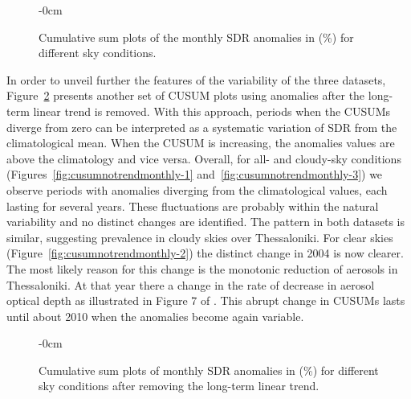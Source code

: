 \documentclass[applsci,article,submit,moreauthors,pdftex]{Definitions/mdpi}
\begin{document}
\begin{figure}[h!]
    \begin{adjustwidth}{-\extralength}{0cm}
        {\centering 
        \hfill
        \hfill
        \hfill
        }
\caption{Cumulative sum plots of the monthly SDR anomalies in (\%) for different sky conditions.}\label{fig:cusummonth}
\end{adjustwidth}
\end{figure}

In order to unveil further the features of the variability of the three
datasets, Figure~\ref{fig:cusumnotrendmonthly} presents another set of
CUSUM plots using anomalies after the long-term linear trend is removed.
With this approach, periods when the CUSUMs diverge from zero can be
interpreted as a systematic variation of SDR from the climatological
mean. When the CUSUM is increasing, the anomalies values are above the
climatology and vice versa. Overall, for all- and cloudy-sky conditions
(Figures~\ref{fig:cusumnotrendmonthly-1}
and~\ref{fig:cusumnotrendmonthly-3}) we observe periods with anomalies
diverging from the climatological values, each lasting for several
years. These fluctuations are probably within the natural variability
and no distinct changes are identified. The pattern in both datasets is
similar, suggesting prevalence in cloudy skies over Thessaloniki. For
clear skies (Figure~\ref{fig:cusumnotrendmonthly-2}) the distinct change
in 2004 is now clearer. The most likely reason for this change is the
monotonic reduction of aerosols in Thessaloniki. At that year there a
change in the rate of decrease in aerosol optical depth as illustrated
in Figure 7 of \citet{Siomos2020}. This abrupt change in CUSUMs lasts
until about 2010 when the anomalies become again variable.

\begin{figure}[h!]
    \begin{adjustwidth}{-\extralength}{0cm}
        {\centering 
            \hfill
            \hfill
        }
        \caption{Cumulative sum plots of monthly SDR anomalies in (\%) for different sky conditions after removing the long-term linear trend.}\label{fig:cusumnotrendmonthly}
\end{adjustwidth}
\end{figure}
\end{document}
